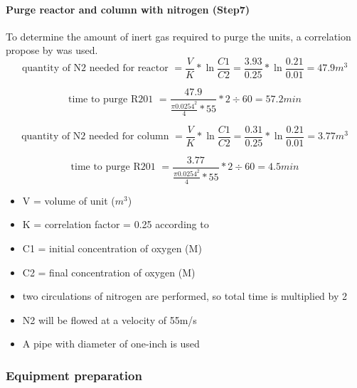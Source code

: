 \paragraph{Purge reactor and column with nitrogen (Step7)}
 To determine the amount of inert gas required to purge the units, a correlation propose by \textcite{kinsley_properly_2001} was used.
 \begin{equation}
        \text{quantity of N2 needed for reactor } = \frac{V}{K} * \ln \frac{C1}{C2} = \frac{3.93}{0.25} * \ln \frac{0.21}{0.01} = 47.9 m^3
    \end{equation}
    
    \begin{equation}
        \text{time to purge R201 } = \frac{47.9}{\frac{\pi 0.0254^2}{4} * 55} * 2 \div 60 = 57.2 min
    \end{equation}
    
    \begin{equation}
        \text{quantity of N2 needed for column } = \frac{V}{K} * \ln \frac{C1}{C2} = \frac{0.31}{0.25} * \ln \frac{0.21}{0.01} = 3.77 m^3
    \end{equation}
    
    \begin{equation}
        \text{time to purge R201 } = \frac{3.77}{\frac{\pi 0.0254^2}{4} * 55} * 2 \div 60 = 4.5 min
    \end{equation}
    
    \begin{itemize}
        \item V = volume of unit ($m^3$)
        \item K = correlation factor = 0.25 according to \textcite{}
        \item C1 = initial concentration of oxygen (M)
        \item C2 = final concentration of oxygen (M)
        \item two circulations of nitrogen are performed, so total time is multiplied by 2
        \item N2 will be flowed at a velocity of 55m/s
        \item A pipe with diameter of one-inch is used
    \end{itemize}
    
\subsubsection{Equipment preparation}

